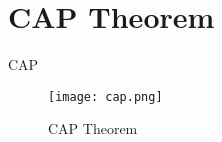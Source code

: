\section{CAP Theorem}
CAP

\begin{figure}[ht]
    \centering
    \texttt{[image: cap.png]}
    \caption{CAP Theorem}
    \label{fig::cap}
\end{figure}